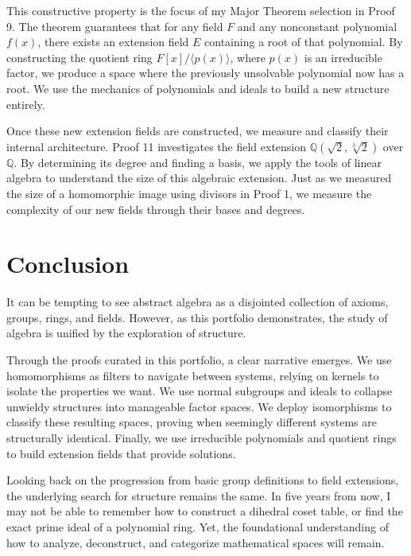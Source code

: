 This constructive property is the focus of my Major Theorem selection in Proof 9. The theorem guarantees that for any field $F$ and any nonconstant polynomial $f(x)$, there exists an extension field $E$ containing a root of that polynomial. By constructing the quotient ring $F[x]/\langle p(x) \rangle$, where $p(x)$ is an irreducible factor, we produce a space where the previously unsolvable polynomial now has a root. We use the mechanics of polynomials and ideals to build a new structure entirely.

Once these new extension fields are constructed, we measure and classify their internal architecture. Proof 11 investigates the field extension $\mathbb{Q}(\sqrt{2}, \sqrt[3]{2})$ over $\mathbb{Q}$. By determining its degree and finding a basis, we apply the tools of linear algebra to understand the size of this algebraic extension. Just as we measured the size of a homomorphic image using divisors in Proof 1, we measure the complexity of our new fields through their bases and degrees.

\section{Conclusion}

It can be tempting to see abstract algebra as a disjointed collection of axioms, groups, rings, and fields. However, as this portfolio demonstrates, the study of algebra is unified by the exploration of structure.

Through the proofs curated in this portfolio, a clear narrative emerges. We use homomorphisms as filters to navigate between systems, relying on kernels to isolate the properties we want. We use normal subgroups and ideals to collapse unwieldy structures into manageable factor spaces. We deploy isomorphisms to classify these resulting spaces, proving when seemingly different systems are structurally identical. Finally, we use irreducible polynomials and quotient rings to build extension fields that provide solutions.

Looking back on the progression from basic group definitions to field extensions, the underlying search for structure remains the same. In five years from now, I may not be able to remember how to construct a dihedral coset table, or find the exact prime ideal of a polynomial ring. Yet, the foundational understanding of how to analyze, deconstruct, and categorize mathematical spaces will remain.